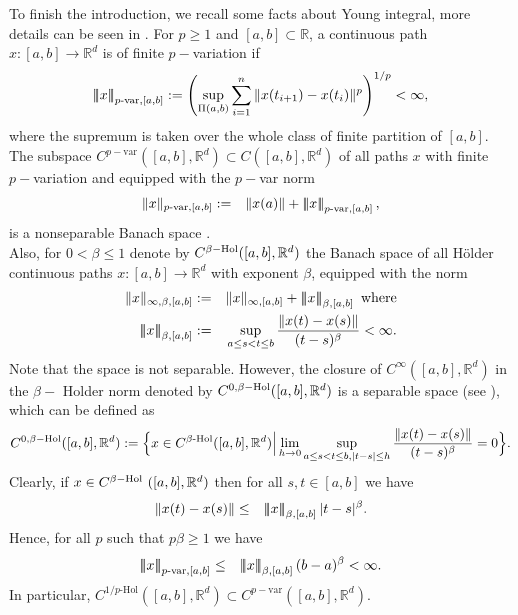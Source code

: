 \documentclass[graybox]{svmult}
\newcommand{\R}{\ensuremath{\mathbb{R}}}
\newcommand{\ltn}{\ensuremath{\left| \! \left| \! \left|}}
\newcommand{\rtn}{\ensuremath{\right| \! \right| \! \right|}}
\begin{document}
To finish the introduction, we recall some facts about Young integral, more details can be seen in \cite{friz}. For $p\geq 1$ and $[a,b] \subset \R$, a continuous path $x:[a,b] \to \R^d$ is of finite $p-$variation if 
\begin{eqnarray}
\ltn x\rtn_{p\text{-var},[a,b]} :=\left(\sup_{\Pi(a,b)}\sum_{i=1}^n\|x(t_{i+1})-x(t_i)\|^p\right)^{1/p} < \infty,
\end{eqnarray}
where the supremum is taken over the whole class of finite partition of $[a,b]$. The subspace $C^{p-\text{var}}([a,b],\R^d)\subset C([a,b],\R^d)$ of all paths  $x$ with finite $p-$variation and equipped with the $p-$var norm
\begin{eqnarray*}
	\|x\|_{p\text{-var},[a,b]}&:=& \|x(a)\|+\ltn x\rtn_{p\text{-var},[a,b]},
\end{eqnarray*}
is a nonseparable Banach space \cite[Theorem 5.25, p.\ 92]{friz}.\\
Also, for $0<\beta \leq 1$ denote by $C^{\beta\rm{-Hol} }([a,b],\R^d)$ the Banach space of all H\"older continuous paths $x:[a,b]\to \R^d$ with exponent $\beta$, equipped with the norm
\begin{eqnarray}
\|x\|_{\infty,\beta,[a,b]} &:=& \|x\|_{\infty,[a,b]} + \ltn x\rtn_{\beta,[a,b]}\ \text{where}\notag\\
\ltn x\rtn_{\beta,[a,b]}&:=&  \sup_{a\leq s<t\leq b} \frac{\|x(t)-x(s)\|}{(t-s)^{\beta}}< \infty.
\end{eqnarray}
Note that the space is not separable. However, the closure of $C^{\infty}([a,b],\R^d)$ in the $\beta-$ Holder norm denoted by $C^{0,\beta\rm{-Hol}}([a,b],\R^d)$ is a separable space (see \cite[Theorem 5.31, p. 96]{friz}), which can be defined as
\[
C^{0,\beta\rm{-Hol}}([a,b],\R^d) := \Big\{x \in C^{\beta\text{-Hol}}([a,b],\R^d) \Big|\lim \limits_{h \to 0} \sup_{a\leq s<t\leq b, |t-s|\leq h} \frac{\|x(t)-x(s)\|}{(t-s)^{\beta}} = 0 \Big\}.
\]
Clearly, if $x\in C^{\beta\rm{-Hol}\ }([a,b],\R^d)$ then for all $s,t\in [a,b]$ we have
\begin{eqnarray*}%
	\|x(t)-x(s)\|&\leq& \ltn x\rtn_{\beta,[a,b]} |t-s|^\beta.
\end{eqnarray*}
Hence, for all $p$ such that $p\beta\geq 1$ we have
\begin{eqnarray}\label{pvar-Hol.norm}
\ltn x\rtn_{p\text{-var},[a,b]}&\leq& \ltn x\rtn_{\beta,[a,b]} (b-a)^\beta<\infty.
\end{eqnarray} 
In particular, $C^{1/p\text{-Hol} }([a,b],\R^d)\subset C^{p-\text{var}}([a,b],\R^d)$. \\
\end{document}
